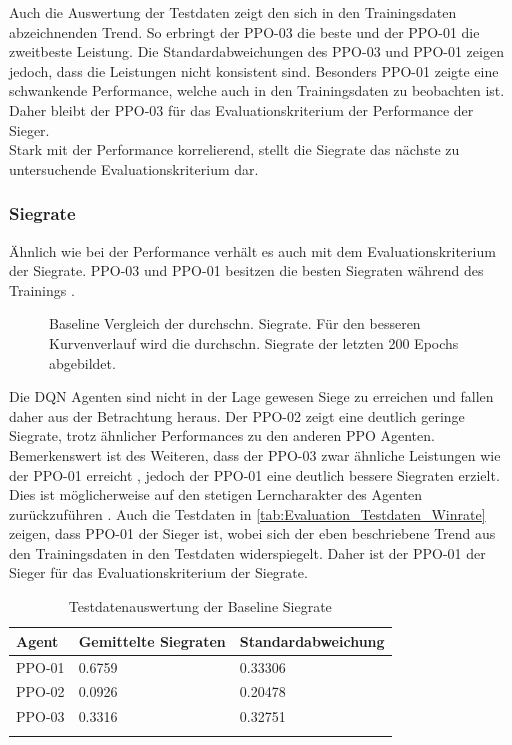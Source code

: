 \newpage
Auch die Auswertung der Testdaten  zeigt den sich in den Trainingsdaten abzeichnenden Trend. So erbringt der PPO-03 die beste und der PPO-01 die zweitbeste Leistung. Die Standardabweichungen des PPO-03 und PPO-01 zeigen jedoch, dass die Leistungen nicht konsistent sind. Besonders PPO-01 zeigte eine schwankende Performance, welche auch in den Trainingsdaten  zu beobachten ist.
Daher bleibt der PPO-03 für das Evaluationskriterium der Performance der Sieger.\\
Stark mit der Performance korrelierend, stellt die Siegrate das nächste zu untersuchende Evaluationskriterium dar.

\subsubsection{Siegrate} \label{sec:Evaluation_Siegrate}
Ähnlich wie bei der Performance verhält es auch mit dem Evaluationskriterium der Siegrate. PPO-03 und PPO-01 besitzen die besten Siegraten während des Trainings .
\begin{figure}[H]
	\centering
	
	\caption[Baseline Vergleich Siegrate]{Baseline Vergleich der durchschn. Siegrate. Für den besseren Kurvenverlauf wird die durchschn. Siegrate der letzten 200 Epochs abgebildet.}
	\label{fig:Baseline_winrate}
\end{figure}
Die DQN Agenten sind nicht in der Lage gewesen Siege zu erreichen und fallen daher aus der Betrachtung heraus.
Der PPO-02 zeigt eine deutlich geringe Siegrate, trotz ähnlicher Performances zu den anderen PPO Agenten.
Bemerkenswert ist des Weiteren, dass der PPO-03 zwar ähnliche Leistungen wie der PPO-01 erreicht , jedoch der PPO-01 eine deutlich bessere Siegraten erzielt. Dies ist möglicherweise auf den stetigen Lerncharakter des Agenten zurückzuführen .
Auch die Testdaten in \autoref{tab:Evaluation_Testdaten_Winrate} zeigen, dass PPO-01 der Sieger ist, wobei sich der eben beschriebene Trend aus den Trainingsdaten in den Testdaten widerspiegelt. Daher ist der PPO-01 der Sieger für das Evaluationskriterium der Siegrate.
\newpage
\begin{longtable}[h]{|p{3.7cm}|p{4.5cm}|p{4.5cm}|}
	\hline
	Agent & Gemittelte Siegraten & Standardabweichung \\
	\hline
	PPO-01 & 0.6759 & 0.33306 \\
	\hline
	PPO-02 & 0.0926 & 0.20478 \\
	\hline
	PPO-03 & 0.3316 & 0.32751 \\
	\hline
	\caption{Testdatenauswertung der Baseline Siegrate}
	\label{tab:Evaluation_Testdaten_Winrate} 
\end{longtable}
